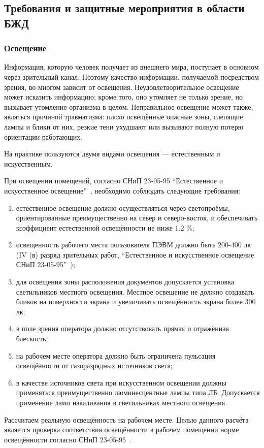 \subsection{Требования и защитные мероприятия в области БЖД}
\subsubsection{Освещение}
Информация, которую человек получает из внешнего мира, поступает в основном через зрительный канал. Поэтому качество информации, получаемой посредством зрения, во многом зависит от освещения. Неудовлетворительное освещение может исказить информацию; кроме того, оно утомляет не только зрение, но вызывает утомление организма в целом. Неправильное освещение может также, являться причиной травматизма: плохо освещённые опасные зоны, слепящие лампы и блики от них, резкие тени ухудшают или вызывают полную потерю ориентации работающих.

На практике пользуются двумя видами освещения — естественным и искусственным.

При освещении помещений, согласно СНиП 23-05-95 ``Естественное и искусственное освещение''~\cite{OT6}, необходимо соблюдать следующие требования:

\begin{enumerate}
\item естественное освещение должно осуществляться через светопроёмы, ориентированные преимущественно на север и северо-восток, и обеспечивать коэффициент естественной освещённости не ниже 1.2 \%;
\item освещенность рабочего места пользователя ПЭВМ должно быть 200-400 лк (IV (в) разряд зрительных работ, ``Естественное и искусственное освещение СНиП 23-05-95''~\cite{OT6});
\item для освещения зоны расположения документов допускается установка светильников местного освещения. Местное освещение не должно создавать бликов на поверхности экрана и увеличивать освещённость экрана более 300 лк;
\item в поле зрения оператора должно отсутствовать прямая и отражённая блескость;
\item на рабочем месте оператора должно быть ограничена пульсация освещённости от газоразрядных источников света;
\item в качестве источников света при искусственном освещении должны применяться преимущественно люминесцентные лампы типа ЛБ. Допускается применение ламп накаливания в светильниках местного освещения.
\end{enumerate}
Рассчитаем реальную освещённость на рабочем месте. Целью данного расчёта является проверка соответствия освещённости в рабочем помещении норме освещённости согласно СНиП 23-05-95~\cite{OT6}.

